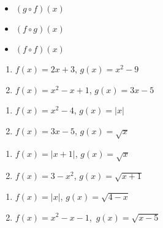 \begin{multicols}{3}

\begin{itemize}

\item  $(g \circ f)(x)$

\item  $(f \circ g)(x)$

\item  $(f \circ f)(x)$


\end{itemize}

\end{multicols}


\begin{multicols}{2}
\begin{enumerate}
\setcounter{enumi}{\value{HW}}

\item  $f(x) = 2x+3$, $g(x) = x^2-9$ \label{funccompexp1first}
\item  $f(x) = x^2 -x+1$, $g(x) = 3x-5$ 

\setcounter{HW}{\value{enumi}}
\end{enumerate}
\end{multicols}

\begin{multicols}{2}
\begin{enumerate}
\setcounter{enumi}{\value{HW}}

\item  $f(x) = x^2-4$, $g(x) = |x|$
\item  $f(x) = 3x-5$, $g(x) = \sqrt{x}$ 

\setcounter{HW}{\value{enumi}}
\end{enumerate}
\end{multicols}

\begin{multicols}{2}
\begin{enumerate}
\setcounter{enumi}{\value{HW}}

\item  $f(x) = |x+1|$, $g(x) = \sqrt{x}$
\item  $f(x) = 3-x^2$, $g(x) = \sqrt{x+1}$ 

\setcounter{HW}{\value{enumi}}
\end{enumerate}
\end{multicols}

\begin{multicols}{2}
\begin{enumerate}
\setcounter{enumi}{\value{HW}}

\item  $f(x) = |x|$, $g(x) = \sqrt{4-x}$
\item  \mbox{$f(x) = x^2-x-1$, $g(x) = \sqrt{x-5}$} 

\setcounter{HW}{\value{enumi}}
\end{enumerate}
\end{multicols}

